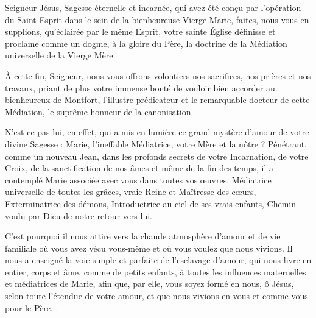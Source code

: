 \documentclass{bibliotheca-missel}
\begin{document}
\priere{}

\priere Seigneur Jésus, Sagesse éternelle et incarnée, qui avez été conçu par l’opération du Saint-Esprit dans le sein de la bienheureuse Vierge Marie, faites, nous vous en supplions, qu’éclairée par le même Esprit, votre sainte Église définisse et proclame comme un dogme, à la gloire du Père, la doctrine de la Médiation universelle de la Vierge Mère.

À cette fin, Seigneur, nous vous offrons volontiers nos sacrifices, nos prières et nos travaux, priant de plus votre immense bonté de vouloir bien accorder au bienheureux de Montfort, l’illustre prédicateur et le remarquable docteur de cette Médiation, le suprême honneur de la canonisation.

N’est-ce pas lui, en effet, qui a mis en lumière ce grand mystère d’amour de votre divine Sagesse : Marie, l’ineffable Médiatrice, votre Mère et la nôtre ? Pénétrant, comme un nouveau Jean, dans les profonds secrets de votre Incarnation, de votre Croix, de la sanctification de nos âmes et même de la fin des temps, il a contemplé Marie associée avec vous dans toutes vos œuvres, Médiatrice universelle de toutes les grâces, vraie Reine et Maîtresse des cœurs, Exterminatrice des démons, Introductrice au ciel de ses vrais enfants, Chemin voulu par Dieu de notre retour vers lui.

C’est pourquoi il nous attire vers la chaude atmosphère d’amour et de vie familiale où vous avez vécu vous-même et où vous voulez que nous vivions. Il nous a enseigné la voie simple et parfaite de l’esclavage d’amour, qui nous livre en entier, corps et âme, comme de petits enfants, à toutes les influences maternelles et médiatrices de Marie, afin que, par elle, vous soyez formé en nous, ô Jésus, selon toute l’étendue de votre amour, et que nous vivions en vous et comme vous pour le Père, .
\end{document}
